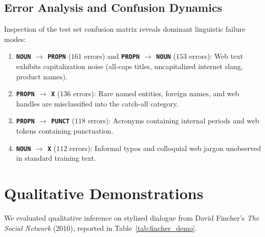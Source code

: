 \documentclass[conference]{IEEEtran}
\begin{document}
\subsection{Error Analysis and Confusion Dynamics}
Inspection of the test set confusion matrix reveals dominant linguistic failure modes:
\begin{enumerate}
    \item \textbf{\texttt{NOUN} $\rightarrow$ \texttt{PROPN}} ($161$ errors) and \textbf{\texttt{PROPN} $\rightarrow$ \texttt{NOUN}} ($153$ errors): Web text exhibits capitalization noise (all-caps titles, uncapitalized internet slang, product names).
    \item \textbf{\texttt{PROPN} $\rightarrow$ \texttt{X}} ($136$ errors): Rare named entities, foreign names, and web handles are misclassified into the catch-all category.
    \item \textbf{\texttt{PROPN} $\rightarrow$ \texttt{PUNCT}} ($118$ errors): Acronyms containing internal periods and web tokens containing punctuation.
    \item \textbf{\texttt{NOUN} $\rightarrow$ \texttt{X}} ($112$ errors): Informal typos and colloquial web jargon unobserved in standard training text.
\end{enumerate}

\section{Qualitative Demonstrations}
We evaluated qualitative inference on stylized dialogue from David Fincher's \textit{The Social Network} (2010), reported in Table~\ref{tab:fincher_demo}.
\end{document}
